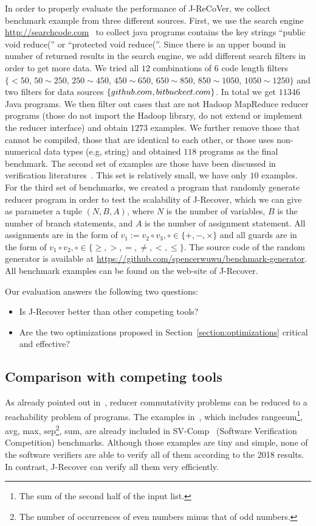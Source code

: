 \documentclass{llncs}
\begin{document}
 In order to properly evaluate the performance of J-ReCoVer, we collect benchmark example from three different sources. 
First, we use the search engine \url{http://searchcode.com}~\cite{searchcode} to collect java programs contains the key strings ``public void reduce('' or ``protected void reduce(''.  Since there is an upper bound in number of returned results in the search engine, we add different search filters in order to get more data. We tried all $12$ combinations of $6$ code length filters $\{<50$, $ 50\sim 250$, $250\sim 450$, $450\sim 650$, $650\sim 850$, $850\sim 1050$, $1050\sim 1250\}$ 
and two filters for data sources $\{github.com, bitbuckect.com\}$. In total we get $11346$ Java programs. We then filter out cases that are not Hadoop MapReduce reducer programs (those do not import the Hadoop library, do not extend or implement the reducer interface) and obtain $1273$ examples. We further remove those that cannot be compiled, those that are identical to each other, or those uses non-numerical data types (e.g, string) and obtained $118$ programs as the final benchmark.
The second set of examples are those have been discussed in verification literatures~\cite{ChenHSW15,ChenSW16,SmithA16}. This set is relatively small, we have only $10$ examples. 
For the third set of benchmarks, we created a program that randomly generate reducer program in order to test the scalability of J-Recover, which we can give as parameter a tuple $(N,B,A)$, where $N$ is the number of variables, $B$ is the number of branch statements, and $A$ is the number of assignment statement. All assignments are in the form of $v_1 := v_2\circ v_3,\circ\in\{+,-,\times\}$ and all guards are in the form of $v_1 \circ v_2, \circ\in\{\geq, >,=, \neq, <,\leq \}$.
 The source code of the random generator is available at \url{https://github.com/spencerwuwu/benchmark-generator}.
All benchmark examples can be found on the web-site of J-Recover.

Our evaluation answers the following two questions:
\begin{itemize}
	\item Is J-Recover better than other competing tools?
	\item Are the two optimizations proposed in Section~\ref{section:optimizations} critical and effective?
\end{itemize} 

\subsection{Comparison with competing tools}
As already pointed out in~\cite{ChenHSW15}, reducer commutativity problems can be reduced to a reachability problem of programs. 
The examples in~\cite{ChenHSW15}, which includes \textsf{rangesum}\footnote{The sum of the second half of the input list.}, \textsf{avg}, \textsf{max}, \textsf{sep}\footnote{The number of occurrences of even numbers minus that of odd numbers.}, \textsf{sum}, are already included in SV-Comp~\cite{svcomp} (Software Verification Competition) benchmarks.
Although those examples are tiny and simple, none of the software verifiers are able to verify all of them according to the 2018 results. In contrast, J-Recover can verify all them very efficiently. 
\end{document}
